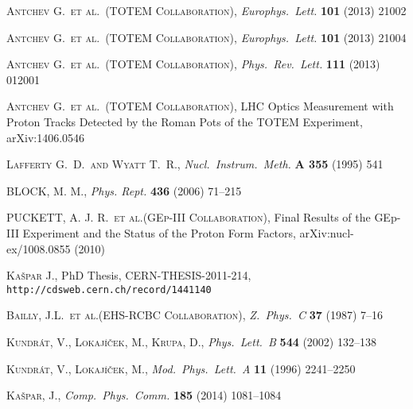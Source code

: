 \documentclass[3p,twocolumn,a4paper]{elsarticle}
\def\etal{et al.}
\def\Name#1{\textsc{#1}, }
\def\REVIEW#1#2#3#4{{\it #1} {\bf #2} (#3) #4}
\begin{document}
\begin{thebibliography}{99}
	\Name{Antchev G.~\etal{}~(TOTEM Collaboration)}
	\REVIEW{Europhys.~Lett.}{101}{2013}{21002}


	\Name{Antchev G.~\etal{}~(TOTEM Collaboration)}
	\REVIEW{Europhys.~Lett.}{101}{2013}{21004}

	\Name{Antchev G.~\etal{}~(TOTEM Collaboration)}
	\REVIEW{Phys.~Rev.~Lett.}{111}{2013}{012001}


	\Name{Antchev G.~\etal{}~(TOTEM Collaboration)}
	LHC Optics Measurement with Proton Tracks Detected by the Roman Pots of the TOTEM Experiment, 
	arXiv:1406.0546

	\Name{Lafferty G.~D.~and Wyatt T.~R.}
	\REVIEW{Nucl.\ Instrum.\ Meth.}{A 355}{1995}{541}


	\Name{BLOCK, M. M.}
	\REVIEW{Phys. Rept.}{436}{2006}{71--215}

	\Name{PUCKETT, A. J. R.~\etal{}(GEp-III Collaboration)}
	Final Results of the GEp-III Experiment and the Status of the Proton Form Factors,
	arXiv:nucl-ex/1008.0855 (2010)

	\Name{Ka\v spar J.}
	PhD Thesis, CERN-THESIS-2011-214, {\tt http://cdsweb.cern.ch/record/1441140}

	\Name{Bailly, J.L.~\etal{}(EHS-RCBC Collaboration)}
	\REVIEW{Z.~Phys.~C}{37}{1987}{7--16}

	\Name{Kundr\' at, V., Lokaj\' i\v cek, M., Krupa, D.}
	\REVIEW{Phys.~Lett.~B}{544}{2002}{132--138}

	\Name{Kundr\' at, V., Lokaj\' i\v cek, M.}
	\REVIEW{Mod.~Phys.~Lett.~A}{11}{1996}{2241--2250}

	\Name{Ka\v spar, J.}
	\REVIEW{Comp.~Phys.~Comm.}{185}{2014}{1081--1084}

\end{thebibliography}
\end{document}
